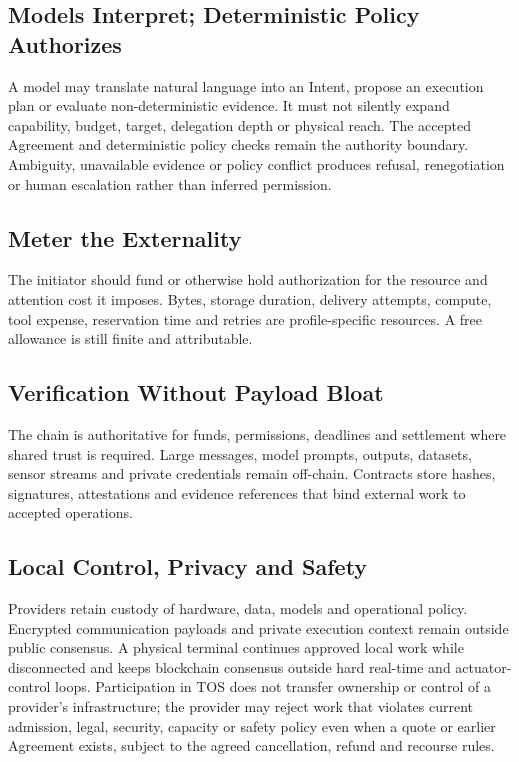 \documentclass[11pt,oneside]{article}
\begin{document}
\subsection{Models Interpret; Deterministic Policy Authorizes}

A model may translate natural language into an Intent, propose an execution plan or evaluate
non-deterministic evidence. It must not silently expand capability, budget, target, delegation
depth or physical reach. The accepted Agreement and deterministic policy checks remain the
authority boundary. Ambiguity, unavailable evidence or policy conflict produces refusal,
renegotiation or human escalation rather than inferred permission.

\subsection{Meter the Externality}

The initiator should fund or otherwise hold authorization for the resource and attention cost
it imposes. Bytes, storage duration, delivery attempts, compute, tool expense, reservation
time and retries are profile-specific resources. A free allowance is still finite and
attributable.

\subsection{Verification Without Payload Bloat}

The chain is authoritative for funds, permissions, deadlines and settlement where shared
trust is required. Large messages, model prompts, outputs, datasets, sensor streams and
private credentials remain off-chain. Contracts store hashes, signatures, attestations and
evidence references that bind external work to accepted operations.

\subsection{Local Control, Privacy and Safety}

Providers retain custody of hardware, data, models and operational policy. Encrypted
communication payloads and private execution context remain outside public consensus. A
physical terminal continues approved local work while disconnected and keeps blockchain
consensus outside hard real-time and actuator-control loops. Participation in TOS does not
transfer ownership or control of a provider's infrastructure; the provider may reject work
that violates current admission, legal, security, capacity or safety policy even when a quote
or earlier Agreement exists, subject to the agreed cancellation, refund and recourse rules.
\end{document}
